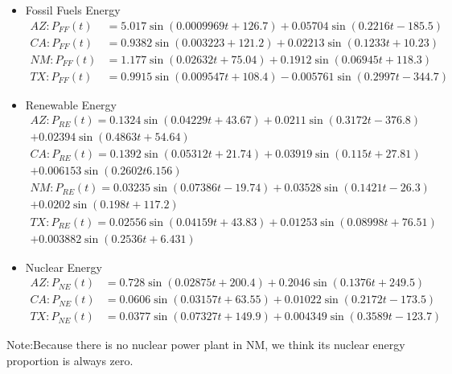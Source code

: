 \documentclass{mcmthesis}
\begin{document}
\begin{itemize}
	\item Fossil Fuels Energy\\
	\begin{align}
	AZ:P_{FF}(t)&=5.017\sin(0.0009969t+126.7)+0.05704\sin(0.2216t-185.5)\\%
	CA:P_{FF}(t)&=0.9382\sin(0.003223+121.2)+0.02213\sin(0.1233t+10.23)\\%
	NM:P_{FF}(t)&=1.177\sin(0.02632t+75.04)+0.1912\sin(0.06945t+118.3)\\%
	TX:P_{FF}(t)&=0.9915\sin(0.009547t+108.4)-0.005761\sin(0.2997t-344.7)%
	\end{align}
	\item Renewable Energy\\
	\begin{multline}
	AZ:P_{RE}(t)=0.1324\sin(0.04229t+43.67)+0.0211\sin(0.3172t-376.8)\\+0.02394\sin(0.4863t+54.64)%
	\end{multline}
	\begin{multline}
	CA:P_{RE}(t)=0.1392\sin(0.05312t+21.74)+0.03919\sin(0.115t+27.81)\\+0.006153\sin(0.2602t6.156)%
	\end{multline}
	\begin{multline}
	NM:P_{RE}(t)=0.03235\sin(0.07386t-19.74)+0.03528\sin(0.1421t-26.3)\\+0.0202\sin(0.198t+117.2)%
	\end{multline}
	\begin{multline}
	TX:P_{RE}(t)=0.02556\sin(0.04159t+43.83)+0.01253\sin(0.08998t+76.51)\\+0.003882\sin(0.2536t+6.431)%
	\end{multline}
	\item Nuclear Energy\\
	\begin{align}
	AZ:P_{NE}(t)&=0.728\sin(0.02875t+200.4)+0.2046\sin(0.1376t+249.5)\\%
	CA:P_{NE}(t)&=0.0606\sin(0.03157t+63.55)+0.01022\sin(0.2172t-173.5)\\%
	TX:P_{NE}(t)&=0.0377\sin(0.07327t+149.9)+0.004349\sin(0.3589t-123.7)%
	\end{align}
\end{itemize}
Note:Because there is no nuclear power plant in NM, we think its nuclear energy proportion is always zero.
\end{document}
